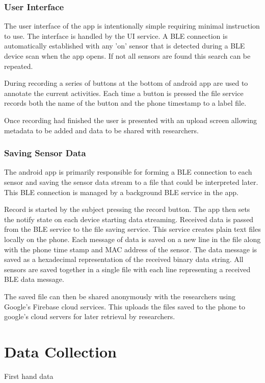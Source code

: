 \subsubsection{User Interface}
The user interface of the app is intentionally simple requiring minimal instruction to use. The interface is handled by the UI service. A BLE connection is automatically established with any 'on' sensor that is detected during a BLE device scan when the app opens. If not all sensors are found this search can be repeated.

During recording a series of buttons at the bottom of android app are used to annotate the current activities. Each time a button is pressed the file service records both the name of the button and the phone timestamp to a label file.

Once recording had finished the user is presented with an upload screen allowing metadata to be added and data to be shared with researchers.

\subsubsection{Saving Sensor Data}
The android app is primarily responsible for forming a BLE connection to each sensor and saving the sensor data stream to a file that could be interpreted later. This BLE connection is managed by a background BLE service in the app.

Record is started by the subject pressing the record button. The app then sets the notify state on each device starting data streaming. Received data is passed from the BLE service to the file saving service. This service creates plain text files locally on the phone. Each message of data is saved on a new line in the file along with the phone time stamp and MAC address of the sensor. The data message is saved as a hexadecimal representation of the received binary data string. All sensors are saved together in a single file with each line representing a received BLE data message.

The saved file can then be shared anonymously with the researchers using Google's Firebase cloud services. This uploads the files saved to the phone to google's cloud servers for later retrieval by researchers.

\section{Data Collection}
First hand data

